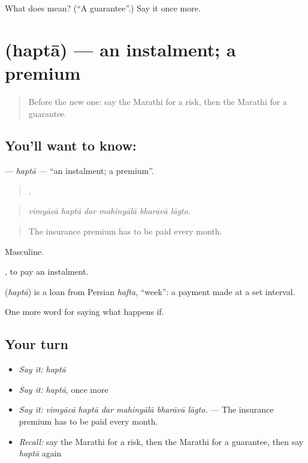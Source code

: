 \begin{tcolorbox}[breakable,colback=teal!4,colframe=teal!35!black,title={Before you move on}]
What does  mean? (\textquotedblleft{}A guarantee\textquotedblright{}.) Say it once more.
\end{tcolorbox}
\section[\texorpdfstring{\mr{हप्ता} (haptā)}{हप्ता (haptā)}]{ (haptā) — an instalment; a premium}

\label{lesson:MR-C540-hapta}



\begin{quote}
Before the new one: say the Marathi for a risk, then the Marathi for a guarantee.
\end{quote}

\subsection*{You'll want to know: }
\textbf{} — \emph{haptā} — \textquotedblleft{}an instalment; a premium\textquotedblright{}.

\begin{quote}
     .
\end{quote}

\begin{quote}
\emph{vimyācā haptā dar mahinyālā bharāvā lāgto.}
\end{quote}

\begin{quote}
The insurance premium has to be paid every month.
\end{quote}

Masculine.

 , to pay an instalment.

\begin{cousinweb}
\textbf{} (\emph{haptā}) is a loan from Persian \emph{hafta}, \textquotedblleft{}week\textquotedblright{}: a payment made at a set interval.
\end{cousinweb}

\begin{grammarlens}[title={What you've built}]
One more word for saying what happens if.
\end{grammarlens}

\subsection*{Your turn}
\begin{itemize}
\raggedright
  \item \emph{Say it:} \emph{haptā}
  \item \emph{Say it:} \emph{haptā}, once more
  \item \emph{Say it:} \emph{vimyācā haptā dar mahinyālā bharāvā lāgto.} — The insurance premium has to be paid every month.
  \item \emph{Recall:} say the Marathi for a risk, then the Marathi for a guarantee, then say \emph{haptā} again
\end{itemize}

